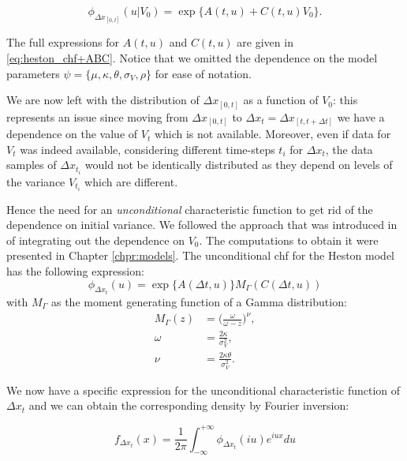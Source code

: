 \begin{equation}
\phi_{\Delta x_{[0, t] }}(u|V_0) =  \exp\{A(t,u) + C(t,u) V_0\}.
\end{equation}

The full expressions for $A(t,u)$ and $C(t,u)$ are given in \eqref{eq:heston_chf+ABC}.
Notice that we omitted the dependence on the model parameters $\psi = \{\mu, \kappa, \theta, \sigma_V, \rho \}$ for ease of notation.

\bigskip
We are now left with the distribution of $\Delta x_{[0, t] }$ as a function of $V_0$: this represents an issue since moving from $\Delta x_{[0, t] }$ to $\Delta x_t  = \Delta x_{[t, t + \Delta t]}$ we have a dependence on the value of $V_t$ which is not available. Moreover, even if data for $V_t$ was indeed available, considering different time-steps $t_i$ for $\Delta x_{t}$, the data samples of $\Delta x_{t_i}$ would not be identically distributed as they depend on levels of the variance $V_{t_i}$ which are different.

Hence the need for an \textit{unconditional} characteristic function to get rid of the dependence on initial variance. We followed the approach that was introduced in \citep{DRAGULESCU2002} of integrating out the dependence on $V_0$. The computations to obtain it were presented in Chapter \ref{chpr:models}.
The unconditional chf for the Heston model has the following expression:
\begin{equation}
 \phi_{\Delta x_t}(u) = \exp\{A(\Delta t,u) \} M_{\Gamma}(C(\Delta t,u))
\end{equation}
\noindent
with $M_{\Gamma}$ as the moment generating function of a Gamma distribution:
\begin{subequations}
\begin{align}
	M_{\Gamma} (z) &= \Big(\frac{\omega}{\omega-z}\Big)^\nu, \nonumber \\
	\omega&= \frac{2\kappa}{\sigma_V^2} ,\nonumber\\
	\nu&= \frac{2\kappa\theta}{\sigma_V^2}.\nonumber
\end{align}
\end{subequations}

We now have a specific expression for the unconditional characteristic function of $\Delta x_t$ and we can obtain the corresponding density by Fourier inversion:

\begin{equation}
\label{eq:uncond_inversion}
f_{\Delta x_t}(x) = \frac{1}{2\pi}\int_{-\infty}^{+\infty}  \phi_{\Delta x_t}(i u) e^{i u x} du
\end{equation}


